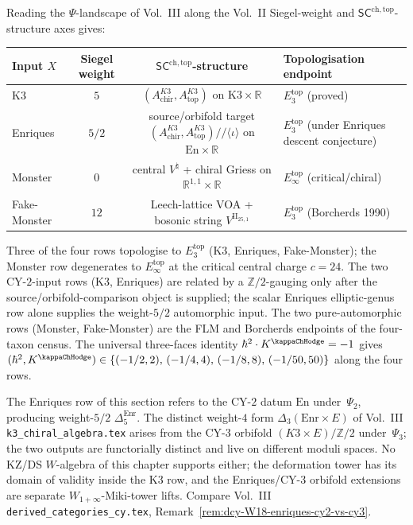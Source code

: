 \begin{remark}
\label{rem:wac-W18-four-row-landscape}
Reading the $\Psi$-landscape of Vol.~III
along the Vol.~II Siegel-weight and $\mathsf{SC}^{\mathrm{ch,top}}$-structure axes
gives:
\begin{center}
\begin{tabular}{lccl}
\toprule
Input $X$ & Siegel weight & $\mathsf{SC}^{\mathrm{ch,top}}$-structure &
 Topologisation endpoint \\
\midrule
K3 & $5$ & $(A^{K3}_{\mathrm{chir}}, A^{K3}_{\mathrm{top}})$ on
 $\mathrm{K3}\times\mathbb{R}$ & $E_3^{\mathrm{top}}$
 (proved) \\
Enriques & $5/2$ &
 source/orbifold target
 $(A^{K3}_{\mathrm{chir}}, A^{K3}_{\mathrm{top}})/\!/\langle\iota\rangle$
 on $\mathrm{En}\times\mathbb{R}$ & $E_3^{\mathrm{top}}$
 (under Enriques descent conjecture) \\
Monster & $0$ & central $V^{\natural}$ + chiral Griess
 on $\mathbb{R}^{1,1}\times\mathbb{R}$ & $E_\infty^{\mathrm{top}}$
 (critical/chiral) \\
Fake-Monster & $12$ & Leech-lattice VOA + bosonic string
 $V^{\mathrm{II}_{25,1}}$ & $E_3^{\mathrm{top}}$ (Borcherds 1990) \\
\bottomrule
\end{tabular}
\end{center}
Three of the four rows topologise to $E_3^{\mathrm{top}}$
(K3, Enriques, Fake-Monster); the Monster row degenerates to
$E_\infty^{\mathrm{top}}$ at the critical central charge
$c = 24$. The two CY-$2$-input rows (K3, Enriques) are related by a
$\mathbb{Z}/2$-gauging only after the source/orbifold-comparison object
is supplied; the scalar Enriques elliptic-genus row alone supplies the
weight-$5/2$ automorphic input. The two pure-automorphic rows (Monster,
Fake-Monster) are the FLM and Borcherds endpoints of the four-taxon
census. The universal three-faces identity
$\hbar^2\cdot K^{\kappaChHodge} = -1$ gives
$(\hbar^2, K^{\kappaChHodge})
\in \{(-1/2, 2),\, (-1/4, 4),\, (-1/8, 8),\, (-1/50, 50)\}$
along the four rows.
\end{remark}

\begin{remark}
\label{rem:wac-W18-enriques-cy2-vs-cy3}
The Enriques row of this section refers to the CY-$2$ datum
$\mathrm{En}$ under~$\Psi_2$, producing weight-$5/2$
$\Delta_5^{\mathrm{Enr}}$. The distinct weight-$4$ form
$\Delta_3(\mathrm{Enr}\times E)$ of
Vol.~III \texttt{k3\_chiral\_algebra.tex} arises from the CY-$3$
orbifold $(K3\times E)/\mathbb{Z}/2$ under~$\Psi_3$; the two
outputs are functorially distinct and live on different
moduli spaces. No KZ/DS $W$-algebra of this chapter
supports either; the deformation tower has its domain of
validity inside the K3 row, and the Enriques/CY-$3$
orbifold extensions are separate
$W_{1+\infty}$-Miki-tower lifts. Compare
Vol.~III \texttt{derived\_categories\_cy.tex},
Remark~\ref{rem:dcy-W18-enriques-cy2-vs-cy3}.
\end{remark}
